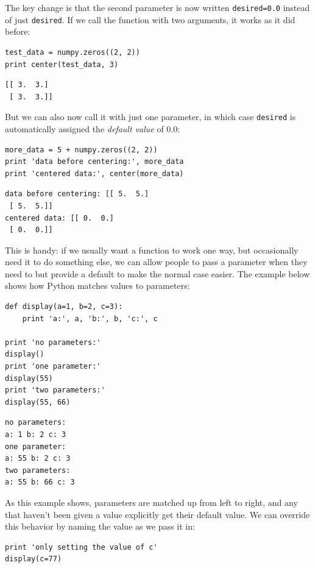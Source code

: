 \documentclass[]{book}
\newcommand{\gdef}[2]{\emph{#2}}
\begin{document}
The key change is that the second parameter is now written
\texttt{desired=0.0} instead of just \texttt{desired}. If we call the
function with two arguments, it works as it did before:

\begin{verbatim}
test_data = numpy.zeros((2, 2))
print center(test_data, 3)
\end{verbatim}

\begin{verbatim}
[[ 3.  3.]
 [ 3.  3.]]
\end{verbatim}

But we can also now call it with just one parameter, in which case
\texttt{desired} is automatically assigned the
\gdef{g:default-parameter-value}{default value} of 0.0:

\begin{verbatim}
more_data = 5 + numpy.zeros((2, 2))
print 'data before centering:', more_data
print 'centered data:', center(more_data)
\end{verbatim}

\begin{verbatim}
data before centering: [[ 5.  5.]
 [ 5.  5.]]
centered data: [[ 0.  0.]
 [ 0.  0.]]
\end{verbatim}

This is handy: if we usually want a function to work one way, but
occasionally need it to do something else, we can allow people to pass a
parameter when they need to but provide a default to make the normal
case easier. The example below shows how Python matches values to
parameters:

\begin{verbatim}
def display(a=1, b=2, c=3):
    print 'a:', a, 'b:', b, 'c:', c

print 'no parameters:'
display()
print 'one parameter:'
display(55)
print 'two parameters:'
display(55, 66)
\end{verbatim}

\begin{verbatim}
no parameters:
a: 1 b: 2 c: 3
one parameter:
a: 55 b: 2 c: 3
two parameters:
a: 55 b: 66 c: 3
\end{verbatim}

As this example shows, parameters are matched up from left to right, and
any that haven't been given a value explicitly get their default value.
We can override this behavior by naming the value as we pass it in:

\begin{verbatim}
print 'only setting the value of c'
display(c=77)
\end{verbatim}
\end{document}

